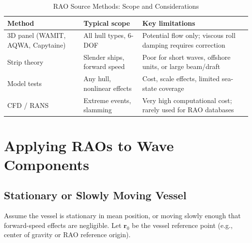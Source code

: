 \documentclass[journal,10pt,twocolumn]{IEEEtran}
\newcommand{\vect}[1]{\bm{#1}}
\begin{document}
    \begin{table}[t]
        \centering
        \caption{RAO Source Methods: Scope and Considerations}
        \label{tab:raosources}
        \small
        \begin{tabular}{@{}L{1.8cm}L{1.6cm}L{2.4cm}@{}}
            \toprule
            Method & Typical scope & Key limitations \\
            \midrule
            3D panel (WAMIT, AQWA, Capytaine)
            & All hull types, 6-DOF
            & Potential flow only; viscous roll damping requires correction \\
            Strip theory
            & Slender ships, forward speed
            & Poor for short waves, offshore units, or large beam/draft \\
            Model tests
            & Any hull, nonlinear effects
            & Cost, scale effects, limited sea-state coverage \\
            CFD / RANS
            & Extreme events, slamming
            & Very high computational cost; rarely used for RAO databases \\
            \bottomrule
        \end{tabular}
    \end{table}

    \section{Applying RAOs to Wave Components}
    \label{sec:applyrao}

    \subsection{Stationary or Slowly Moving Vessel}
    \label{sec:stationary}

    Assume the vessel is stationary in mean position, or moving slowly enough that
    forward-speed effects are negligible.
    Let $\vect{r}_0$ be the vessel reference point (e.g., center of gravity or RAO
    reference origin).
\end{document}
